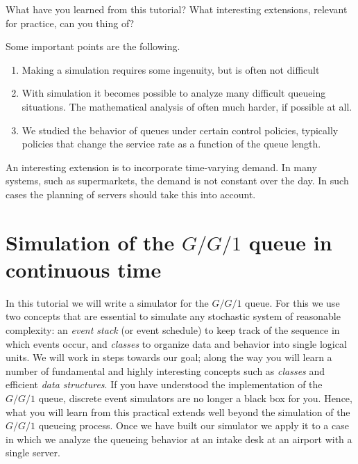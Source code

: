 \documentclass{scrartcl}
\begin{document}
\begin{exercise}
  What have you learned from this tutorial? What interesting extensions, relevant for practice,  can you thing of?
  \begin{solution}
    Some important points are the following.
    \begin{enumerate}
    \item  Making a  simulation requires some ingenuity, but is often not difficult
    \item With simulation it becomes possible to analyze many difficult queueing situations. The mathematical analysis of often much harder, if possible at all.
    \item We studied the behavior of queues under certain control policies, typically policies that change the service rate as a function of the queue length.
    \end{enumerate}

An interesting extension is to incorporate time-varying demand. In many systems, such as supermarkets, the demand is not constant over the day. In such cases the planning of servers should take this into account. 

  \end{solution}
\end{exercise}

\clearpage

\section{Simulation of the $G/G/1$ queue in continuous time}
\label{sec:ggc-continuous-time}

In this tutorial we will write a simulator for the $G/G/1$ queue.
For this we use two concepts that are essential to simulate any stochastic system of reasonable complexity: an \emph{event stack} (or event schedule) to keep track of the sequence in which events occur, and \emph{classes} to organize data and behavior into single logical units.
We will work in steps towards our goal; along the way you will learn a number of fundamental and highly interesting concepts such as \emph{classes} and efficient \emph{data structures}.
If you have understood the implementation of the $G/G/1$ queue, discrete event simulators are no longer a black box for you.
Hence, what you will learn from this practical extends well beyond the simulation of the $G/G/1$ queueing process.
Once we have built our simulator we apply it to a case in which we analyze the queueing behavior at an intake desk at an airport with a single server.
\end{document}
